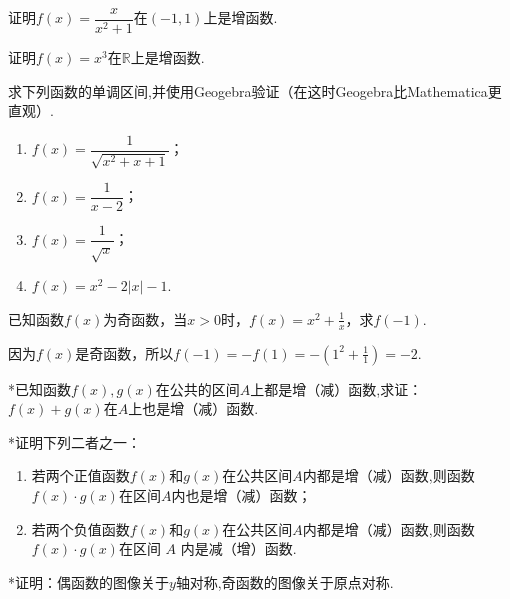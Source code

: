 \documentclass[lang=cn,newtx,10pt,scheme=chinese]{elegantbook}
\begin{document}
\begin{spacing}{1.8}
  \begin{exercise}
    证明$f(x)=\dfrac x{x^2+1}$在$(-1,1)$上是增函数.
  \end{exercise}
  
  \begin{exercise}
    证明$f(x)=x^3$在$\mathbb{R}$上是增函数.
  \end{exercise}
  
  \begin{exercise}
    求下列函数的单调区间,并使用Geogebra验证（在这时Geogebra比Mathematica更直观）.
  \end{exercise}
  
  \begin{enumerate}
    \item $f(x)=\dfrac{1}{\sqrt{x^{2}+x+1}}$；
    \item $f(x)=\dfrac{1}{x-2}$；
    \item $f(x)=\dfrac1{\sqrt{x}}$；
    \item $f(x)=x^{2}-2|x|-1$.
  \end{enumerate}
\end{spacing}

\begin{exercise}
  已知函数$f(x)$为奇函数，当$x>0$时，$f(x)=x^2+\frac1x$，求$f(-1)$.
\end{exercise}

\begin{exercise}
  因为$f(x)$是奇函数，所以$f(-1)=-f(1)=-(1^2+\frac11)=-2$.
\end{exercise}

\begin{exercise}
  *已知函数$f(x),g(x)$在公共的区间$A$上都是增（减）函数,求证：$f(x)+g(x)$在$A$上也是增（减）函数.
\end{exercise}

\begin{exercise}
  *证明下列二者之一：
\end{exercise}

\begin{enumerate}
  \item 若两个正值函数$f(x)$和$g(x)$在公共区间$A$内都是增（减）函数,则函数$f(x)\cdot g(x)$在区间$A$内也是增（减）函数；
  \item 若两个负值函数$f(x)$和$g(x)$在公共区间$A$内都是增（减）函数,则函数$f(x)\cdot g(x)$在区间 $A$ 内是减（增）函数.
\end{enumerate}

\begin{exercise}
  *证明：偶函数的图像关于$y$轴对称,奇函数的图像关于原点对称.
\end{exercise}
\end{document}
